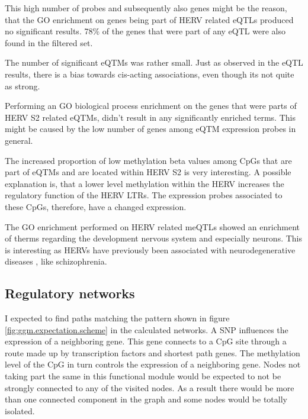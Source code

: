 \documentclass[a4paper,12pt,twoside,openright]{article}
\begin{document}
This high number of probes and subsequently also genes might be the reason, that the GO enrichment on genes being part of HERV related eQTLs produced no significant results. 78\% of the genes that were part of any eQTL were also found in the filtered set.

The number of significant eQTMs was rather small. Just as observed in the eQTL results, there is a bias towards cis-acting associations, even though its not quite as strong. 

Performing an GO biological process enrichment on the genes that were parts of HERV S2 related eQTMs, didn't result in any significantly enriched terms. This might be caused by the low number of genes among eQTM expression probes in general.  

The increased proportion of low methylation beta values among CpGs that are part of eQTMs and are located within HERV S2 is very interesting. A possible explanation is, that a lower level methylation within the HERV increases the regulatory function of the HERV LTRs. The expression probes associated to these CpGs, therefore, have a changed expression. 

The GO enrichment performed on HERV related meQTLs showed an enrichment of therms regarding the development nervous system and especially neurons. This is interesting as HERVs have previously been associated with neurodegenerative diseases \cite{Mortelmans2016}, like schizophrenia\cite{10.3389/fpsyt.2015.00183}.

\subsection{Regulatory networks}
\label{Discussion:Regulatory networks}


I expected to find paths matching the pattern shown in figure \ref{fig:ggm.expectation.scheme} in the calculated networks.  A SNP influences the expression of a neighboring gene. This gene connects to a CpG site through a route made up by transcription factors and shortest path genes. The methylation level of the CpG in turn controls the expression of a neighboring gene. Nodes not taking part the same in this functional module would be expected to not be strongly connected to any of the visited nodes. As a result there would be more than one connected component in the graph and some nodes would be totally isolated. 
\end{document}
